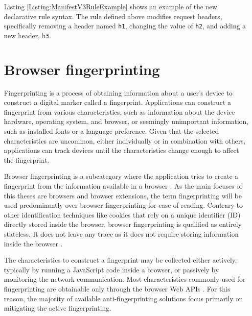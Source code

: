 \medbreak

Listing \ref{Listing:ManifestV3RuleExample} shows an example of the new declarative rule syntax. The rule defined above modifies request headers, specifically removing a header named \texttt{h1}, changing the value of \texttt{h2}, and adding a new header, \texttt{h3}.




\chapter{Browser fingerprinting}
\label{Chapter:BrowserFingerprinting}

Fingerprinting is a process of obtaining information about a user's device to construct a digital marker called a fingerprint. Applications can construct a fingerprint from various characteristics, such as information about the device hardware, operating system, and browser, or seemingly unimportant information, such as installed fonts or a language preference. Given that the selected characteristics are uncommon, either individually or in combination with others, applications can track devices until the characteristics change enough to affect the fingerprint.

Browser fingerprinting is a subcategory where the application tries to create a fingerprint from the information available in a browser \cite{FingerprintingSurvey}. As the main focuses of this theses are browsers and browser extensions, the term fingerprinting will be used predominantly over browser fingerprinting for ease of reading. Contrary to other identification techniques like cookies that rely on a unique identifier (ID) directly stored inside the browser, browser fingerprinting is qualified as entirely stateless. It does not leave any trace as it does not require storing information inside the browser \cite{FingerprintingSurvey}.

The characteristics to construct a fingerprint may be collected either actively, typically by running a JavaScript code inside a browser, or passively by monitoring the network communication. Most characteristics commonly used for fingerprinting are obtainable only through the browser Web APIs \cite{VondracekDP}. For this reason, the majority of available anti-fingerprinting solutions focus primarily on mitigating the active fingerprinting.

